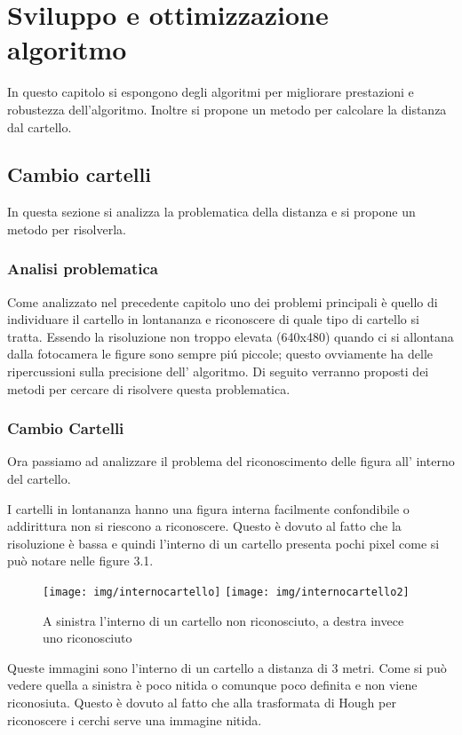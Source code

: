 \chapter{Sviluppo e ottimizzazione algoritmo}

In questo capitolo si espongono degli algoritmi per migliorare prestazioni e robustezza dell'algoritmo. Inoltre si propone un metodo per calcolare la distanza dal cartello.

\section{Cambio cartelli}

	In questa sezione si analizza la problematica della distanza e si propone un metodo per risolverla.

	\subsection{Analisi problematica}
		Come analizzato nel precedente capitolo uno dei problemi principali è quello di individuare il cartello in lontananza e riconoscere di quale tipo di cartello si tratta.
		Essendo la risoluzione non troppo elevata (640x480) quando ci si allontana dalla fotocamera le figure sono sempre pi\'u piccole; questo ovviamente ha delle ripercussioni sulla precisione dell' algoritmo.
		Di seguito verranno proposti dei metodi per cercare di risolvere questa problematica.


	\subsection{Cambio Cartelli}
		Ora passiamo ad analizzare il problema del riconoscimento delle figura all' interno del cartello.

		I cartelli in lontananza hanno una figura interna facilmente confondibile o addirittura non si riescono a riconoscere. Questo è dovuto al fatto che la risoluzione è bassa e quindi l'interno di un cartello presenta pochi pixel come si può notare nelle figure 3.1.

		\begin{figure}[!ht]
			\centering
			\texttt{[image: img/internocartello]}
			\texttt{[image: img/internocartello2]}
			\caption[Interno cartelli]{A sinistra l'interno di un cartello non riconosciuto, a destra invece uno riconosciuto}
		\end{figure}
		
		Queste immagini sono l'interno di un cartello a distanza di 3 metri. Come si può vedere quella a sinistra è poco nitida o comunque poco definita e non viene riconosiuta. Questo è dovuto al fatto che alla trasformata di Hough per riconoscere i cerchi serve una immagine nitida.


